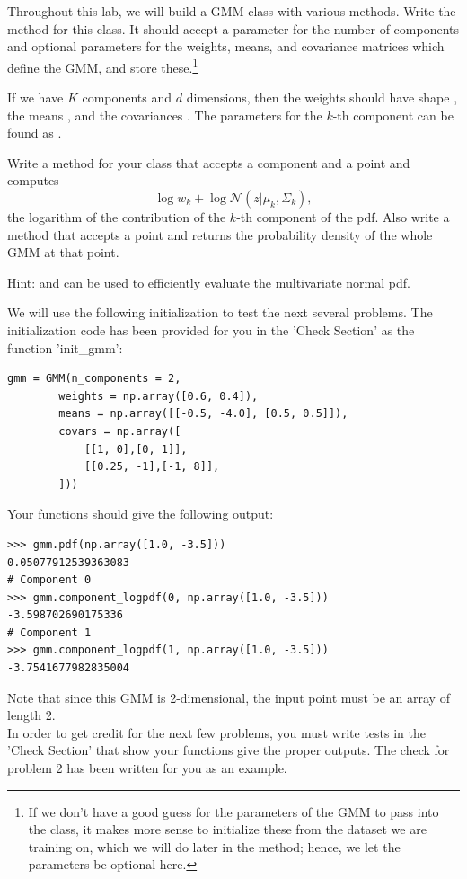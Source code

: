 \begin{problem}
Throughout this lab, we will build a GMM class with various methods.
Write the  method for this class.
It should accept a parameter for the number of components and optional parameters for the weights, means, and covariance matrices which define the GMM, and store these.\footnote{
If we don't have a good guess for the parameters of the GMM to pass into the class, it makes more sense to initialize these from the dataset we are training on, which we will do later in the  method; hence, we let the parameters be optional here.
}

If we have \(K\) components and \(d\) dimensions, then the weights should have shape , the means , and the covariances .
The parameters for the \(k\)-th component can be found as .
\end{problem}
\begin{problem}
Write a method  for your class that accepts a component  and a point  and computes 
\[
\log w_k + \log \mathcal{N}(z|\mu_k,\Sigma_k)
,
\]
the logarithm of the contribution of the \(k\)-th component of the pdf.
Also write a method  that accepts a point  and returns the probability density of the whole GMM at that point.

Hint:  and  can be used to efficiently evaluate the multivariate normal pdf.

We will use the following initialization to test the next several problems. The initialization code has been provided for you in the 'Check Section' as the function 'init\_gmm':
\begin{lstlisting}
gmm = GMM(n_components = 2,
        weights = np.array([0.6, 0.4]),
        means = np.array([[-0.5, -4.0], [0.5, 0.5]]),
        covars = np.array([
            [[1, 0],[0, 1]],
            [[0.25, -1],[-1, 8]],
        ]))
\end{lstlisting}
Your functions should give the following output:
\begin{lstlisting}
>>> gmm.pdf(np.array([1.0, -3.5]))
0.05077912539363083
# Component 0
>>> gmm.component_logpdf(0, np.array([1.0, -3.5]))
-3.598702690175336
# Component 1
>>> gmm.component_logpdf(1, np.array([1.0, -3.5]))
-3.7541677982835004
\end{lstlisting}
Note that since this GMM is 2-dimensional, the input point must be an array of length 2. \\
\indent In order to get credit for the next few problems, you must write tests in the 'Check Section' that show your functions give the proper outputs. The check for problem 2 has been written for you as an example.
\label{prob:gmm_has_example}
\end{problem}

